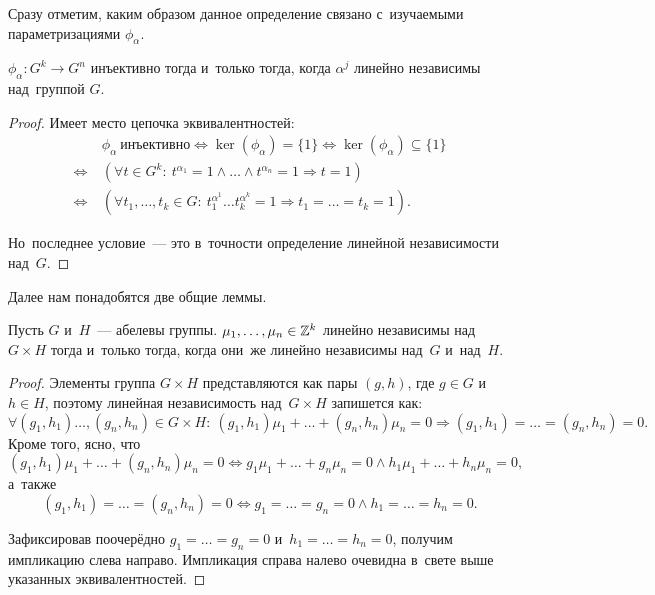\documentclass{article}
\begin{document}
Сразу отметим, каким образом данное определение связано с~изучаемыми параметризациями $\phi_\alpha$.

\begin{theorem}
    $\phi_\alpha : G^k \rightarrow G^n$ инъективно тогда и~только тогда, когда $\alpha^j$ линейно независимы над~группой $G$.
\end{theorem}

\begin{proof}
    Имеет место цепочка эквивалентностей:
    \begin{align*}
                       \ & \phi_\alpha\ \text{инъективно}
        \Leftrightarrow \ker(\phi_\alpha) = \{ 1 \}
        \Leftrightarrow \ker(\phi_\alpha) \subseteq \{ 1 \} \\
        \Leftrightarrow\ & (\forall t \in G^k{:}\ t^{\alpha_1} = 1 \wedge \ldots \wedge t^{\alpha_n} = 1 \Rightarrow t = 1) \\
        \Leftrightarrow\ & (\forall t_1, \ldots, t_k \in G{:}\ t_1^{\alpha^1} \ldots t_k^{\alpha^k} = 1 \Rightarrow t_1 = \ldots = t_k = 1).
    \end{align*}

    Но~последнее условие~— это в~точности определение линейной независимости над~$G$.
\end{proof}

Далее нам понадобятся две общие леммы.

\begin{lemma}
    Пусть $G$ и~$H$~— абелевы группы. $\mu_1, \ldots, \mu_n \in \mathbb{Z}^k$ линейно независимы над~$G \times H$
    тогда и~только тогда, когда они~же линейно независимы над~$G$ и~над~$H$.
\end{lemma}

\begin{proof}
    Элементы группа $G \times H$ представляются как пары $(g, h)$, где $g \in G$ и~$h \in H$, поэтому
    линейная независимость над~$G \times H$ запишется как:
    $$
        \forall (g_1, h_1) \ldots, (g_n, h_n) \in G \times H{:}\ (g_1, h_1) \mu_1 + \ldots + (g_n, h_n) \mu_n = 0 \Rightarrow (g_1, h_1) = \ldots = (g_n, h_n) = 0.
    $$
    Кроме того, ясно, что
    $$
        (g_1, h_1) \mu_1 + \ldots + (g_n, h_n) \mu_n = 0 \Leftrightarrow g_1 \mu_1 + \ldots + g_n \mu_n = 0 \wedge h_1 \mu_1 + \ldots + h_n \mu_n = 0,
    $$
    а~также
    $$
        (g_1, h_1) = \ldots = (g_n, h_n) = 0 \Leftrightarrow g_1 = \ldots = g_n = 0 \wedge h_1 = \ldots = h_n = 0.
    $$

    Зафиксировав поочерёдно $g_1 = \ldots = g_n = 0$ и~$h_1 = \ldots = h_n = 0$, получим импликацию слева направо.
    Импликация справа налево очевидна в~свете выше указанных эквивалентностей.
\end{proof}
\end{document}
